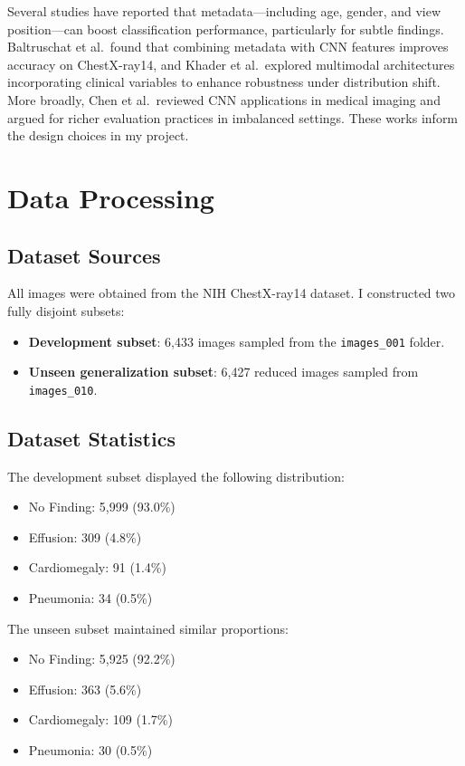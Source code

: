 \documentclass[final]{article}
\begin{document}
Several studies have reported that metadata—including age, gender, and view position—can boost classification performance, particularly for subtle findings. Baltruschat et al.\ found that combining metadata with CNN features improves accuracy on ChestX-ray14, and Khader et al.\ explored multimodal architectures incorporating clinical variables to enhance robustness under distribution shift. More broadly, Chen et al.\ reviewed CNN applications in medical imaging and argued for richer evaluation practices in imbalanced settings. These works inform the design choices in my project.


\section{Data Processing}

\subsection{Dataset Sources}
All images were obtained from the NIH ChestX-ray14 dataset. I constructed two fully disjoint subsets:
\begin{itemize}
    \item \textbf{Development subset}: 6,433 images sampled from the \texttt{images\_001} folder.
    \item \textbf{Unseen generalization subset}: 6,427 reduced images sampled from \texttt{images\_010}.
\end{itemize}

\subsection{Dataset Statistics}
The development subset displayed the following distribution:
\begin{itemize}
    \item No Finding: 5,999 (93.0\%)
    \item Effusion: 309 (4.8\%)
    \item Cardiomegaly: 91 (1.4\%)
    \item Pneumonia: 34 (0.5\%)
\end{itemize}

The unseen subset maintained similar proportions:
\begin{itemize}
    \item No Finding: 5,925 (92.2\%)
    \item Effusion: 363 (5.6\%)
    \item Cardiomegaly: 109 (1.7\%)
    \item Pneumonia: 30 (0.5\%)
\end{itemize}
\end{document}
